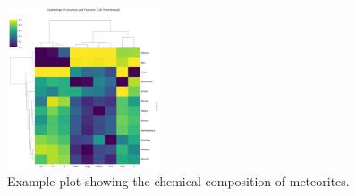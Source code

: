 
\begin{figure}[H]
    \centering
    \includegraphics[width=0.4\textwidth]{figures/clustermap.png}
    \caption{Example plot showing the chemical composition of meteorites.}
    \label{fig:clustermap}
\end{figure}

